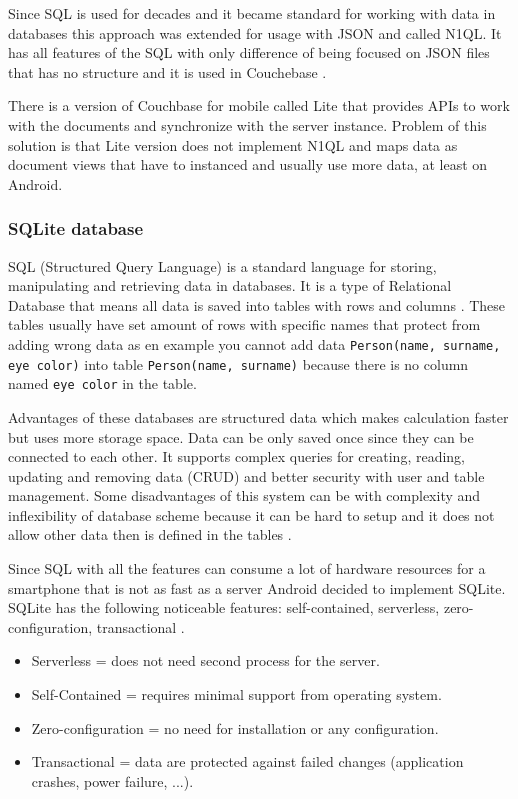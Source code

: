 Since SQL is used for decades and it became standard for working with data in databases this approach was extended for usage with JSON and called N1QL. It has all features of the SQL with only difference of being focused on JSON files that has no structure and it is used in Couchebase \cite{WINQL}.

There is a version of Couchbase for mobile called Lite that provides APIs to work with the documents and synchronize with the server instance. Problem of this solution is that Lite version does not implement N1QL and maps data as document views that have to instanced and usually use more data, at least on Android. 

\subsubsection{SQLite database}\label{subsec:SQLiteDatabase}
SQL (Structured Query Language) is a standard language for storing, manipulating and retrieving data in databases. It is a type of Relational Database that means all data is saved into tables with rows and columns \cite{ItSQL}. These tables usually have set amount of rows with specific names that protect from adding wrong data as en example you cannot add data \verb|Person(name, surname, eye color)| into table \verb|Person(name, surname)| because there is no column named \verb|eye color| in the table.

Advantages of these databases are structured data which makes calculation faster but uses more storage space. Data can be only saved once since they can be connected to each other. It supports complex queries for creating, reading, updating and removing data (CRUD) and better security with user and table management. Some disadvantages of this system can be with complexity and inflexibility of database scheme because it can be hard to setup and it does not allow other data then is defined in the tables \cite{ERDMS}.

Since SQL with all the features can consume a lot of hardware resources for a smartphone that is not as fast as a server Android decided to implement SQLite. SQLite has the following noticeable features: self-contained, serverless, zero-configuration, transactional \cite{WISQLITE}.

\begin{itemize}
	\item Serverless = does not need second process for the server.
	\item Self-Contained = requires minimal support from operating system.
	\item Zero-configuration = no need for installation or any configuration.
	\item Transactional = data are protected against failed changes (application crashes, power failure, ...).
\end{itemize}

